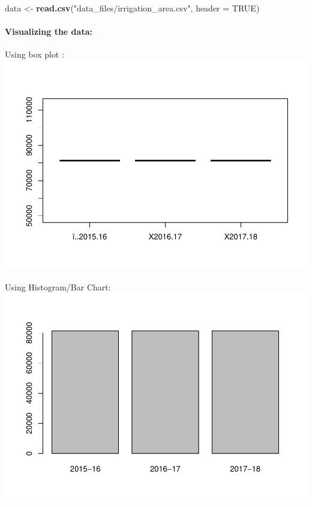\documentclass[]{article}
\newenvironment{Shaded}{\begin{snugshade}}{\end{snugshade}}
\newcommand{\KeywordTok}[1]{\textcolor[rgb]{0.13,0.29,0.53}{\textbf{#1}}}
\newcommand{\DataTypeTok}[1]{\textcolor[rgb]{0.13,0.29,0.53}{#1}}
\newcommand{\StringTok}[1]{\textcolor[rgb]{0.31,0.60,0.02}{#1}}
\newcommand{\OtherTok}[1]{\textcolor[rgb]{0.56,0.35,0.01}{#1}}
\newcommand{\NormalTok}[1]{#1}
\let\oldparagraph\paragraph
\renewcommand{\paragraph}[1]{\oldparagraph{#1}\mbox{}}
\begin{document}
\begin{Shaded}
\begin{Highlighting}[]
\NormalTok{data <-}\StringTok{ }\KeywordTok{read.csv}\NormalTok{(}\StringTok{"data_files/irrigation_area.csv"}\NormalTok{, }\DataTypeTok{header =} \OtherTok{TRUE}\NormalTok{)}
\end{Highlighting}
\end{Shaded}

\paragraph{Visualizing the data:}\label{visualizing-the-data-6}

Using box plot :
\includegraphics{Report_files/figure-latex/unnamed-chunk-26-1.pdf}

Using Histogram/Bar Chart:
\includegraphics{Report_files/figure-latex/unnamed-chunk-27-1.pdf}
\end{document}
